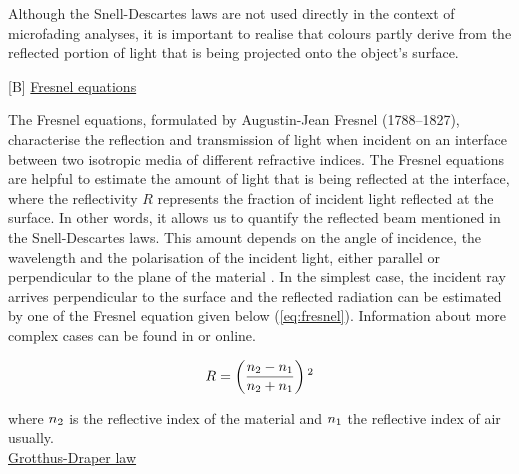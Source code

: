 Although the Snell-Descartes laws are not used directly in the context of microfading analyses, it is important to realise that colours partly derive from the reflected portion of light that is being projected onto the object's surface.\\

\vspace{0.3cm}

[B] \underline{Fresnel equations}

The Fresnel equations, formulated by Augustin-Jean Fresnel (1788–1827), characterise the reflection and transmission of light when incident on an interface between two isotropic media of different refractive indices. The Fresnel equations are helpful to estimate the amount of light that is being reflected at the interface, where the reflectivity $R$ represents the fraction of incident light reflected at the surface. In other words, it allows us to quantify the reflected beam mentioned in the Snell-Descartes laws. This amount depends on the angle of incidence, the wavelength and the polarisation of the incident light, either parallel or perpendicular to the plane of the material \citep[5-6]{berns_billmeyer_2019}. In the simplest case, the incident ray arrives perpendicular to the surface and the reflected radiation can be estimated by one of the Fresnel equation given below (\ref{eq:fresnel}). Information about more complex cases can be found in \citet[6]{berns_billmeyer_2019} or online.

\begin{equation}
    R = \left(\frac{n\textsubscript{2} - n\textsubscript{1}}{n\textsubscript{2} + n\textsubscript{1}}\right)\textsuperscript{2}
\label{eq:fresnel}
\end{equation}

where $n\textsubscript{2}$ is the reflective index of the material and $n\textsubscript{1}$ the reflective index of air usually.\\


\newpage
[C] \underline{Grotthus-Draper law}

